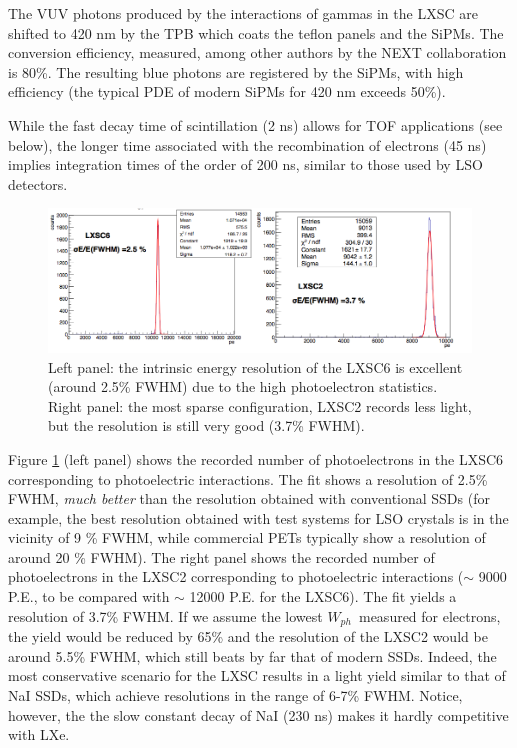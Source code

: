 The VUV photons produced by the interactions of gammas in the LXSC are shifted to 420 nm by the TPB which coats the teflon panels and the SiPMs. The conversion efficiency, measured, among other authors by the NEXT collaboration is 80\%. The resulting blue photons are registered by the SiPMs, with high efficiency (the typical PDE of modern SiPMs for 420 nm exceeds 50\%). 

While the fast decay time of scintillation (2 ns) allows for TOF applications (see below), the longer time associated with the recombination of electrons (45 ns) implies integration times of the order of 200 ns, similar to those used by LSO detectors. 

\begin{figure}[!htb]
	\centering
	\includegraphics[scale=0.5]{img/energyResolution.png}
	\caption{\label{fig.energy}  Left panel: the intrinsic energy resolution of the LXSC6 is excellent (around 2.5\% FWHM) due to the high photoelectron statistics. Right panel: the most sparse configuration, LXSC2 records less light, but the resolution is still very good (3.7\% FWHM). }
\end{figure}

Figure \ref{fig.energy} (left panel) shows the recorded number of photoelectrons in the LXSC6 corresponding to photoelectric interactions. The fit shows a resolution of 2.5\% FWHM, {\em much better} than the resolution obtained with conventional SSDs (for example, the best resolution obtained with test systems for LSO crystals is in the vicinity of 9 \% FWHM, while commercial PETs typically show a resolution of around 20 \% FWHM). The right panel shows the recorded number of photoelectrons in the LXSC2 corresponding to photoelectric interactions ($\sim$ 9000 P.E., to be compared with $\sim$ 12000 P.E. for the LXSC6). The  fit yields a resolution of 3.7\% FWHM. If we assume the lowest $W_{ph}$~measured for electrons, the yield would be reduced by 65\% and the resolution of the LXSC2 would be around 5.5\% FWHM, which still beats by far that of modern SSDs. Indeed, the most conservative scenario for the LXSC results in a light yield similar to that of NaI SSDs, which achieve resolutions in the range of 6-7\% FWHM. Notice, however, the the slow constant decay of NaI (230 ns) makes it hardly competitive with LXe. 

